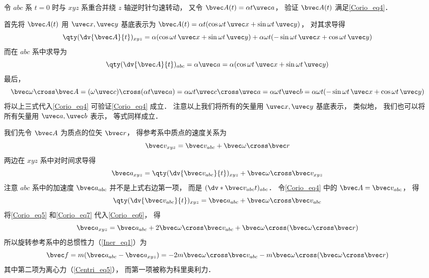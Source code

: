 \begin{example}{}
令 $abc$ 系 $t = 0$ 时与 $xyz$ 系重合并绕 $z$ 轴逆时针匀速转动， 又令 $\bvec A(t) = \alpha t \uvec a$， 验证 $\bvec A(t)$ 满足\autoref{Corio_eq4}．

首先将 $\bvec A(t)$ 用 $\uvec x, \uvec y$ 基底表示为 $\bvec A(t) = \alpha t (\cos\omega t\, \uvec x + \sin\omega t\, \uvec y)$， 对其求导得
\begin{equation}
\qty(\dv{\bvec A}{t})_{xyz} = \alpha (\cos\omega t \,\uvec x + \sin\omega t \,\uvec y)
+ \alpha\omega t (-\sin\omega t \,\uvec x + \cos\omega t \,\uvec y)
\end{equation}
而在 $abc$ 系中求导为
\begin{equation}
\qty(\dv{\bvec A}{t})_{abc} = \alpha \uvec a = \alpha (\cos\omega t\, \uvec x + \sin\omega t \,\uvec y)
\end{equation}
最后，
\begin{equation}
\bvec\omega \cross \bvec A = (\omega \uvec c) \cross (\alpha t \uvec a) = \alpha\omega t \uvec c\cross\uvec a = \alpha\omega t \uvec b = \alpha\omega t(-\sin \omega t \,\uvec x + \cos\omega t \,\uvec y)
\end{equation}
将以上三式代入\autoref{Corio_eq4} 可验证\autoref{Corio_eq4} 成立． 注意以上我们将所有的矢量用 $\uvec x, \uvec y$ 基底表示， 类似地， 我们也可以将所有矢量用 $\uvec a, \uvec b$ 表示， 等式同样成立．
\end{example}

我们先令 $\bvec A$ 为质点的位矢 $\bvec r$， 得参考系中质点的速度关系为
\begin{equation}\label{Corio_eq5}
\bvec v_{xyz} = \bvec v_{abc} + \bvec\omega\cross\bvec r
\end{equation}
两边在 $xyz$ 系中对时间求导得
\begin{equation}\label{Corio_eq6}
\bvec a_{xyz} = \qty(\dv{\bvec v_{abc}}{t})_{xyz} + \bvec\omega\cross\bvec v_{xyz}
\end{equation}
注意 $abc$ 系中的加速度 $\bvec a_{abc}$ 并不是上式右边第一项， 而是 $(\dv*{\bvec v_{abc}}{t})_{abc}$． 令\autoref{Corio_eq4} 中的 $\bvec A = \bvec v_{abc}$， 得
\begin{equation}\label{Corio_eq7}
\qty(\dv{\bvec v_{abc}}{t})_{xyz} = \bvec a_{abc} + \bvec\omega\cross\bvec v_{abc}
\end{equation}
将\autoref{Corio_eq5} 和\autoref{Corio_eq7} 代入\autoref{Corio_eq6}， 得
\begin{equation}
\bvec a_{xyz} = \bvec a_{abc} + 2\bvec\omega\cross\bvec v_{abc} + \bvec\omega\cross(\bvec\omega\cross\bvec r)
\end{equation}
所以旋转参考系中的总惯性力（\autoref{Iner_eq1}）为
\begin{equation}
\bvec f = m(\bvec a_{abc} - \bvec a_{xyz}) = -2m\bvec\omega\cross\bvec v_{abc} - m\bvec\omega\cross(\bvec\omega\cross\bvec r)
\end{equation}
其中第二项为离心力（\autoref{Centri_eq5}）， 而第一项被称为科里奥利力．


